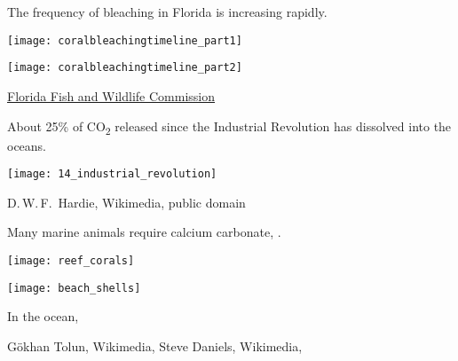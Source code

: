 \documentclass[t]{beamer}
\begin{document}

\begin{frame}{The frequency of bleaching in Florida is increasing rapidly.}
	
	\vspace{-\baselineskip}
	
	\begin{multicols}{2}
		
		\texttt{[image: coralbleachingtimeline\_part1]}
		
		\columnbreak
		
		\texttt{[image: coralbleachingtimeline\_part2]}
		
	\end{multicols}
	
	\tinyfill \href{https://myfwc.com/research/habitat/coral/news-information/bleaching/}{Florida Fish and Wildlife Commission}
	
\end{frame}



\begin{frame}{About 25\% of CO\textsubscript{2} released since the Industrial Revolution has dissolved into the oceans.}
	
	
	\texttt{[image: 14\_industrial\_revolution]}
	
	\vfilll 
	
	\hfill \tiny D.\,W.\,F.~Hardie, Wikimedia, public domain
	
\end{frame}

\begin{frame}{Many marine animals require calcium carbonate, .}
	
	\vspace{-\baselineskip}
	
	\begin{multicols}{2}
		
		\texttt{[image: reef\_corals]}
		
		\columnbreak
		
		\texttt{[image: beach\_shells]}
	\end{multicols}

In the ocean, 

\vfilll

\tiny Gökhan Tolun, Wikimedia,  \hfill Steve Daniels, Wikimedia, 
\end{frame}
\end{document}
